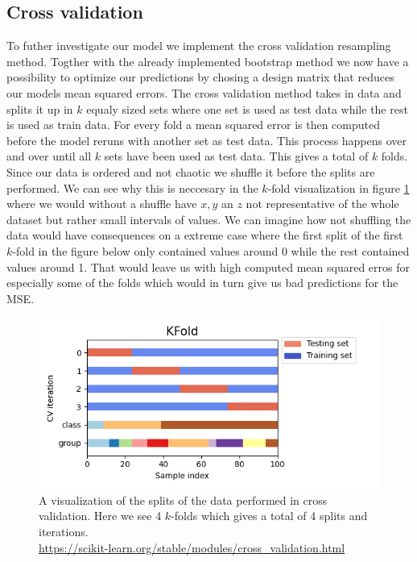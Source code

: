 \documentclass[12pt]{article}
\begin{document}
\subsection{Cross validation}
To futher investigate our model we implement the cross validation resampling method. Togther with the already implemented bootstrap method we now have a possibility to optimize our predictions by chosing a design matrix that reduces our models mean squared errors. The cross validation method takes in data and splits it up in $k$ equaly sized sets where one set is used as test data while the rest is used as train data. For every fold a mean squared error is then computed before the model reruns with another set as test data. This process happens over and over until all $k$ sets have been used as test data. This gives a total of $k$ folds. Since our data is ordered and not chaotic we shuffle it before the splits are performed. We can see why this is neccesary in the $k$-fold visualization in figure \ref{fig:k_fold} where we would without a shuffle have $x,y$ an $z$ not representative of the whole dataset but rather small intervals of values. We can imagine how not shuffling the data would have consequences on a extreme case where the first split of the first $k$-fold in the figure below only contained values around 0 while the rest contained values around 1. That would leave us with high computed mean squared erros for especially some of the folds which would in turn give us bad predictions for the MSE.
\begin{figure}[H]
  \centering
  \includegraphics[width=.7\textwidth]{../figures/cv_kfold.png}
  \caption{A visualization of the splits of the data performed in cross validation. Here we see 4 $k$-folds which gives a total of 4 splits and iterations. \\
  \url{https://scikit-learn.org/stable/modules/cross_validation.html}}
  \label{fig:k_fold}
\end{figure}
\end{document}
